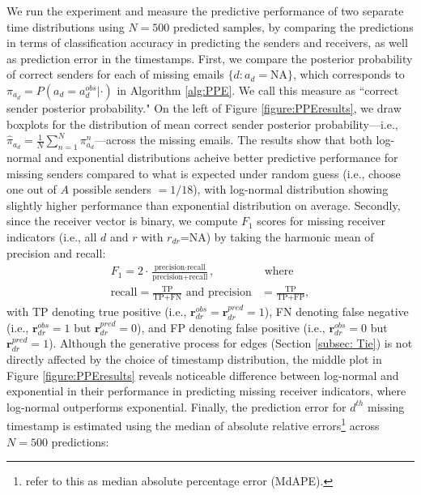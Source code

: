 \documentclass[ba]{imsart}
\numberwithin{equation}{section}
\theoremstyle{plain}
\begin{document}
	We run the experiment and measure the predictive performance of two separate time distributions using $N=500$ predicted samples, by comparing the predictions in terms of classification accuracy in predicting the senders and receivers, as well as prediction error in the timestamps. First, we compare the posterior probability of correct senders for each of missing emails $\{d:a_d=\mbox{NA}\}$, which corresponds to $\pi_{a_{d}}=P(a_{d} = a^{obs}_{d}|\cdot)$ in Algorithm \ref{alg:PPE}. We call this measure as ``correct sender posterior probability." On the left of Figure \ref{figure:PPEresults}, we draw boxplots for the distribution of mean correct sender posterior probability---i.e., $\hat{\pi}_{a_{d}} = \frac{1}{N}\sum_{n=1}^N \pi^n_{a_{d}}$---across the missing emails. The results show that both log-normal and exponential distributions acheive better predictive performance for missing senders compared to what is expected under random guess (i.e., choose one out of $A$ possible senders $=1/18$), with log-normal distribution showing slightly higher performance than exponential distribution on average. Secondly, since the receiver vector is binary, we compute $F_1$ scores for missing receiver indicators (i.e., all $d$ and $r$ with $r_{dr}$=NA) by taking the harmonic mean of precision and recall:
	\begin{equation}
	\begin{aligned}
	F_1 =2\cdot\frac{\mbox{precision}\cdot \mbox{recall}}{\mbox{precision}+ \mbox{recall}}, &\mbox{ where } \\
			\mbox{recall}  = \frac{\mbox{TP}}{\mbox{TP+FN}} \mbox{ and } \mbox{precision} & =\frac{\mbox{TP}}{\mbox{TP+FP}},
			\end{aligned}
	\end{equation}
	with TP denoting true positive (i.e., $\boldsymbol{r}^{obs}_{dr}=\boldsymbol{r}^{pred}_{dr}=1$), FN denoting false negative (i.e., $\boldsymbol{r}^{obs}_{dr}=1$ but $\boldsymbol{r}^{pred}_{dr}=0$), and FP denoting false positive (i.e., $\boldsymbol{r}^{obs}_{dr}=0$ but $\boldsymbol{r}^{pred}_{dr}=1$). Although the generative process for edges (Section \ref{subsec: Tie}) is not directly affected by the choice of timestamp distribution, the middle plot in Figure \ref{figure:PPEresults} reveals noticeable difference between log-normal and exponential in their performance in predicting missing receiver indicators, where log-normal outperforms exponential. Finally, the prediction error for $d^{th}$ missing timestamp is estimated using the median of absolute relative errors\footnote{\cite{hyndman2006another} refer to this as median absolute percentage error (MdAPE).} across $N=500$ predictions:
\end{document}
